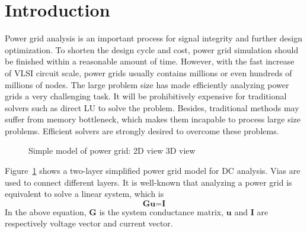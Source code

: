 \documentclass{sig-alternate}
\begin{document}
\section{Introduction}
Power grid analysis is an important process for signal integrity and further design 
optimization. To shorten the design cycle and cost, power grid simulation should be finished within a reasonable amount of time. 
However, with the fast increase of VLSI circuit scale, power grids usually contains millions or even hundreds of millions 
of nodes. The large problem size has made efficiently analyzing power grids a very challenging task. It will be prohibitively 
expensive for traditional solvers such as direct LU to solve the problem. Besides, traditional methods may suffer from memory 
bottleneck, which makes them incapable to process large size problems. Efficient solvers are strongly desired to overcome these problems.
	\begin{figure}[htbp]
	  \caption{Simple model of power grid: 
	   2D view
	   3D view}
	  \label{pg_model}
	\end{figure}
Figure~\ref{pg_model} shows a two-layer simplified power grid model for DC analysis. Vias are used to 
	connect different layers. It is well-known that analyzing a power grid is equivalent to solve a linear system, which is 
	\begin{equation}\label{eq1}
		\textbf{Gu=I}
	\end{equation}
In the above equation, {$\textbf{G}$} is the system conductance matrix, $\textbf{u}$ and $\textbf{I}$ are respectively voltage vector and current vector.
\end{document}
